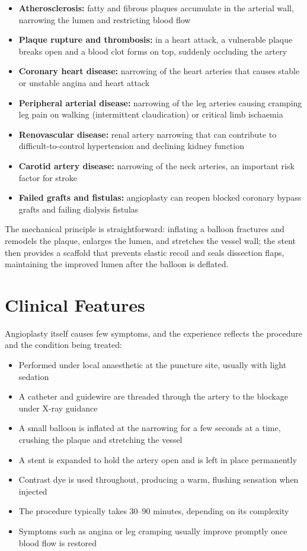 \begin{itemize}
    \item \textbf{Atherosclerosis:} fatty and fibrous plaques accumulate in the arterial wall, narrowing the lumen and restricting blood flow
    \item \textbf{Plaque rupture and thrombosis:} in a heart attack, a vulnerable plaque breaks open and a blood clot forms on top, suddenly occluding the artery
    \item \textbf{Coronary heart disease:} narrowing of the heart arteries that causes stable or unstable angina and heart attack
    \item \textbf{Peripheral arterial disease:} narrowing of the leg arteries causing cramping leg pain on walking (intermittent claudication) or critical limb ischaemia
    \item \textbf{Renovascular disease:} renal artery narrowing that can contribute to difficult-to-control hypertension and declining kidney function
    \item \textbf{Carotid artery disease:} narrowing of the neck arteries, an important risk factor for stroke
    \item \textbf{Failed grafts and fistulas:} angioplasty can reopen blocked coronary bypass grafts and failing dialysis fistulas
\end{itemize}

The mechanical principle is straightforward: inflating a balloon fractures and remodels the plaque, enlarges the lumen, and stretches the vessel wall; the stent then provides a scaffold that prevents elastic recoil and seals dissection flaps, maintaining the improved lumen after the balloon is deflated.

\section*{Clinical Features}
Angioplasty itself causes few symptoms, and the experience reflects the procedure and the condition being treated:

\begin{itemize}
    \item Performed under local anaesthetic at the puncture site, usually with light sedation
    \item A catheter and guidewire are threaded through the artery to the blockage under X-ray guidance
    \item A small balloon is inflated at the narrowing for a few seconds at a time, crushing the plaque and stretching the vessel
    \item A stent is expanded to hold the artery open and is left in place permanently
    \item Contrast dye is used throughout, producing a warm, flushing sensation when injected
    \item The procedure typically takes 30--90 minutes, depending on its complexity
    \item Symptoms such as angina or leg cramping usually improve promptly once blood flow is restored
\end{itemize}

